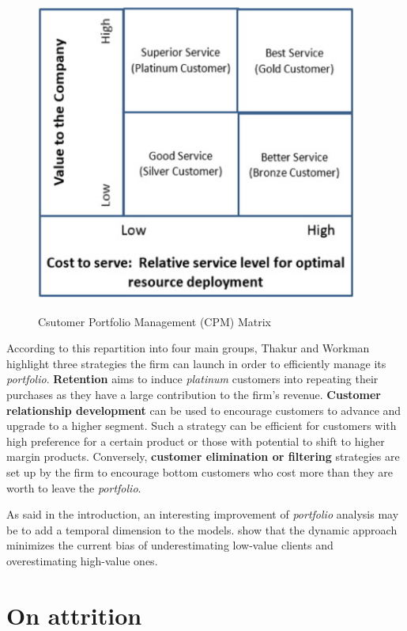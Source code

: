 \documentclass[
]{book}
\begin{document}
\begin{figure}

{\centering \includegraphics[width=300pt,height=300pt]{./imgs/cpm_matrix} 

}

\caption{Csutomer Portfolio Management (CPM) Matrix}\label{fig:cpmmat}
\end{figure}

According to this repartition into four main groups, Thakur and Workman highlight three strategies the firm can launch in order to efficiently manage its \emph{portfolio}. \textbf{Retention} aims to induce \emph{platinum} customers into repeating their purchases as they have a large contribution to the firm's revenue. \textbf{Customer relationship development} can be used to encourage customers to advance and upgrade to a higher segment. Such a strategy can be efficient for customers with high preference for a certain product or those with potential to shift to higher margin products. Conversely, \textbf{customer elimination or filtering} strategies are set up by the firm to encourage bottom customers who cost more than they are worth to leave the \emph{portfolio}.

As said in the introduction, an interesting improvement of \emph{portfolio} analysis may be to add a temporal dimension to the models. \citet{MANAGING_DYNAMICS_CUSTOMER_PORTFOLIO} show that the dynamic approach minimizes the current bias of underestimating low-value clients and overestimating high-value ones.

\hypertarget{attrition}{%
\section{On attrition}\label{attrition}}
\end{document}
